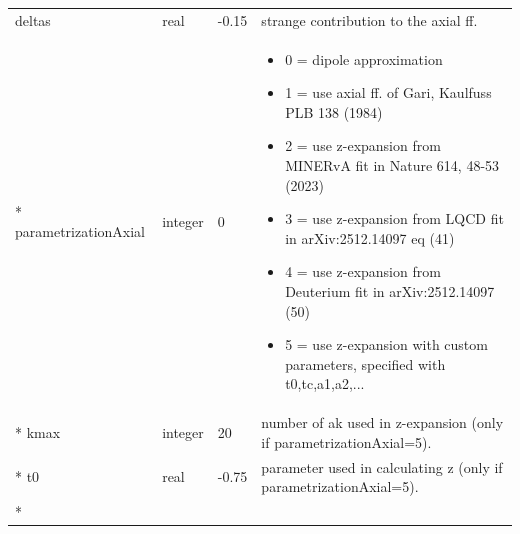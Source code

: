 \documentclass{article}
\begin{document}
\begin{longtable}{llll}
\midrule
deltas & \begin{minipage}[t]{2cm}real\end{minipage} & \begin{minipage}[t]{2cm}-0.15\end{minipage} & \begin{minipage}[t]{12cm}strange contribution to the axial ff.\end{minipage}\\*
\midrule
parametrizationAxial & \begin{minipage}[t]{2cm}integer\end{minipage} & \begin{minipage}[t]{2cm}0\end{minipage} & \begin{minipage}[t]{12cm}\begin{itemize}\leftmargin0em\itemindent0pt\item 0 = dipole approximation\item 1 = use axial ff. of Gari, Kaulfuss PLB 138 (1984)\item 2 = use z-expansion from MINERvA fit in Nature 614, 48-53 (2023)\item 3 = use z-expansion from LQCD fit in arXiv:2512.14097 eq (41)\item 4 = use z-expansion from Deuterium fit in arXiv:2512.14097 (50)\item 5 = use z-expansion with custom parameters, specified with t0,tc,a1,a2,...\end{itemize}\end{minipage}\\*
\midrule
kmax & \begin{minipage}[t]{2cm}integer\end{minipage} & \begin{minipage}[t]{2cm}20\end{minipage} & \begin{minipage}[t]{12cm}number of ak used in z-expansion (only if parametrizationAxial=5).\end{minipage}\\*
\midrule
t0 & \begin{minipage}[t]{2cm}real\end{minipage} & \begin{minipage}[t]{2cm}-0.75\end{minipage} & \begin{minipage}[t]{12cm}parameter used in calculating z (only if parametrizationAxial=5).\end{minipage}\\*

\end{longtable}
\end{document}
